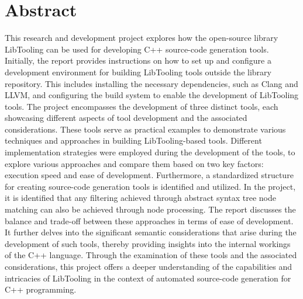 \section*{Abstract}
This research and development project explores how the open-source library LibTooling can be used for developing C++ source-code generation tools.
Initially, the report provides instructions on how to set up and configure a development environment for building LibTooling tools outside the library repository. This includes installing the necessary dependencies, such as Clang and LLVM, and configuring the build system to enable the development of LibTooling tools.
The project encompasses the development of three distinct tools, each showcasing different aspects of tool development and the associated considerations.
These tools serve as practical examples to demonstrate various techniques and approaches in building LibTooling-based tools.
Different implementation strategies were employed during the development of the tools, to explore various approaches and compare them based on two key factors: execution speed and ease of development.
Furthermore, a standardized structure for creating source-code generation tools is identified and utilized.
In the project, it is identified that any filtering achieved through abstract syntax tree node matching can also be achieved through node processing.
The report discusses the balance and trade-off between these approaches in terms of ease of development.
It further delves into the significant semantic considerations that arise during the development of such tools, thereby providing insights into the internal workings of the C++ language.
Through the examination of these tools and the associated considerations, this project offers a deeper understanding of the capabilities and intricacies of LibTooling in the context of automated source-code generation for C++ programming.